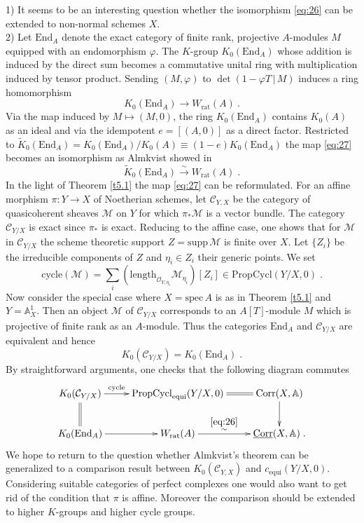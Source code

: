 \documentclass[12pt,leqno]{article}
\newcommand{\A}{{\mathbb{A}}}
\newcommand{\tK}{\tilde{K}}
\newcommand{\Corr}{\mathrm{Corr}}
\newcommand{\uCorr}{\underline{\Corr}}
\newcommand{\cycle}{\mathrm{cycle}}
\newcommand{\length}{\mathrm{length}}
\newcommand{\equi}{\mathrm{equi}}
\newcommand{\spec}{\mathrm{spec}\,}
\newcommand{\supp}{\mathrm{supp}\,}
\newcommand{\End}{\mathrm{End}}
\newcommand{\PropCycl}{\mathrm{PropCycl}}
\newcommand{\rat}{\mathrm{rat}}
\newcommand{\Ch}{{\mathcal C}}
\newcommand{\Mh}{{\mathcal M}}
\newcommand{\Oh}{{\mathcal O}}
\newcommand{\silo}{\stackrel{\sim}{\rightarrow}}
\newenvironment{rems}{\noindent {\bf Remarks}}{}
\begin{document}
\begin{rems}
1) It seems to be an interesting question whether the isomorphism \eqref{eq:26} can be extended to non-normal schemes $X$.\\
2) Let $\End_A$ denote the exact category of finite rank, projective $A$-modules $M$ equipped with an endomorphism $\varphi$. The $K$-group $K_0 (\End_A)$ whose addition is induced by the direct sum becomes a commutative unital ring with multiplication induced by tensor product. Sending $(M , \varphi)$ to $\det (1 - \varphi T \,|\, M)$ induces a ring homomorphism
\begin{equation}
\label{eq:27}
K_0 (\End_A) \longrightarrow W_{\rat} (A) \ .
\end{equation}
Via the map induced by $M \mapsto (M , 0)$, the ring $K_0 (\End_A)$ contains $K_0 (A)$ as an ideal and via the idempotent $e = [(A,0)]$ as a direct factor. Restricted to $\tK_0 (\End_A) = K_0 (\End_A) / K_0 (A) \equiv (1 - e) K_0 (\End_A)$ the map \eqref{eq:27} becomes an isomorphism as Almkvist showed in \cite{A}
\begin{equation}
\label{eq:28}
\tK_0 (\End_A) \silo W_{\rat} (A) \; .
\end{equation}
In the light of Theorem \ref{t5.1} the map \eqref{eq:27} can be reformulated. For an affine morphism $\pi : Y \to X$ of Noetherian schemes, let $\Ch_{Y , X}$ be the category of quasicoherent sheaves $\Mh$ on $Y$ for which $\pi_* \Mh$ is a vector bundle. The category $\Ch_{Y /X}$ is exact since $\pi_*$ is exact. Reducing to the affine case, one shows that for $\Mh$ in $\Ch_{Y / X}$ the scheme theoretic support $Z = \supp \Mh$ is finite over $X$. Let $\{ Z_i \}$ be the irreducible components of $Z$ and $\eta_i \in Z_i$ their generic points. We set
\[
\cycle (\Mh) = \sum_i (\length_{\Oh_{Y , \eta_i}} \Mh_{\eta_i}) [Z_i] \in \PropCycl (Y / X , 0) \; .
\]
Now consider the special case where $X = \spec A$ is as in Theorem \ref{t5.1} and $Y = \A^1_X$. Then an object $\Mh$ of $\Ch_{Y / X}$ corresponds to an $A [T]$-module $M$ which is projective of finite rank as an $A$-module. Thus the categories $\End_A$ and $\Ch_{Y / X}$ are equivalent and hence
\[
K_0 (\Ch_{Y / X}) = K_0 (\End_A) \; .
\]
By straightforward arguments, one checks that the following diagram commutes
\begin{equation}
\label{eq:29}
\vcenter{\xymatrix{
K_0 (\Ch_{Y / X}) \ar[r]^-{\cycle} \ar@{=}[d] & \PropCycl_{\equi} (Y / X , 0) \ar@{=}[r] & \Corr (X, \A) \ar[d] \\
K_0 (\End_A) \ar[r] & W_{\rat} (A) \ar[r]^-{\overset{\eqref{eq:26}}{\sim}} & \uCorr (X, \A) \; .
}}
\end{equation}
We hope to return to the question whether Almkvist's theorem can be generalized to a comparison result between $K_0 (\Ch_{Y, X})$ and $c_{\equi} (Y/X , 0)$. Considering suitable categories of perfect complexes one would also want to get rid of the condition that $\pi$ is affine. Moreover the comparison should be extended to higher $K$-groups and higher cycle groups.
\end{rems}
\end{document}
